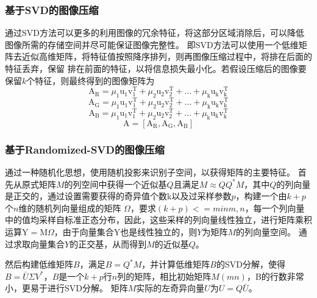 \documentclass{article}
\begin{document}
\subsubsection*{基于SVD的图像压缩}
通过SVD方法可以更多的利用图像的冗余特征，将这部分区域消除后，可以降低图像所需的存储空间并尽可能保证图像完整性。
即SVD方法可以使用一个低维矩阵去近似高维矩阵，将特征值按照降序排列，则再图像压缩过程中，将排在后面的特征丢弃，保留
排在前面的特征，以将信息损失最小化。若假设压缩后的图像要保留$k$个特征，则最终得到的图像矩阵为
$$\mathrm{A_{R}}=\mu_1 \mathrm{u}_1 \mathrm{v}_1^{\mathrm{T}}+\mu_2 \mathrm{u}_2 \mathrm{v}_2^{\mathrm{T}}+\ldots+\mu_{\mathrm{k}} \mathrm{u}_{\mathrm{k}} \mathrm{v}_{\mathrm{k}}^{\mathrm{T}}$$
$$\mathrm{A_{G}}=\mu_1 \mathrm{u}_1 \mathrm{v}_1^{\mathrm{T}}+\mu_2 \mathrm{u}_2 \mathrm{v}_2^{\mathrm{T}}+\ldots+\mu_{\mathrm{k}} \mathrm{u}_{\mathrm{k}} \mathrm{v}_{\mathrm{k}}^{\mathrm{T}}$$
$$\mathrm{A_{B}}=\mu_1 \mathrm{u}_1 \mathrm{v}_1^{\mathrm{T}}+\mu_2 \mathrm{u}_2 \mathrm{v}_2^{\mathrm{T}}+\ldots+\mu_{\mathrm{k}} \mathrm{u}_{\mathrm{k}} \mathrm{v}_{\mathrm{k}}^{\mathrm{T}}$$
$$\mathrm{A} = [\mathrm{A_{R}}, \mathrm{A_{G}},  \mathrm{A_{B}}]$$

\subsubsection*{基于Randomized-SVD的图像压缩}
通过一种随机化思想，使用随机投影来识别子空间，以获得矩阵的主要特征。
首先从原式矩阵$M$的列空间中获得一个近似基$Q$且满足$M \approx Q Q^* M$，其中$Q$的列向量是正交的，通过设置需要获得的奇异值个数k以及过采样参数$p$，构建一个由$k + p$个$n$维的随机列向量组成的矩阵
$\Omega $，要求$(k + p) <= min{m,n}$，每一个列向量中的值均采样自标准正态分布，因此，这些采样的列向量线性独立，进行矩阵乘积运算$\mathrm{Y}=\mathrm{M} \Omega$，由于向量集合Y也是线性独立的，则$Y$为矩阵$M$的列向量空间。
通过求取向量集合$Y$的正交基，从而得到$M$的近似基$Q$。

然后构建低维矩阵$B$，满足$B=Q^* M$，并计算低维矩阵$B$的SVD分解，使得$B=\bar{U} \Sigma V^{*}$，$B$是一个$k+p$行$n$列的矩阵，相比初始矩阵$M(mn)$，B的行数非常小，更易于进行SVD分解。
矩阵$M$实际的左奇异向量$U$为$U=Q \bar{U}$。
\end{document}
